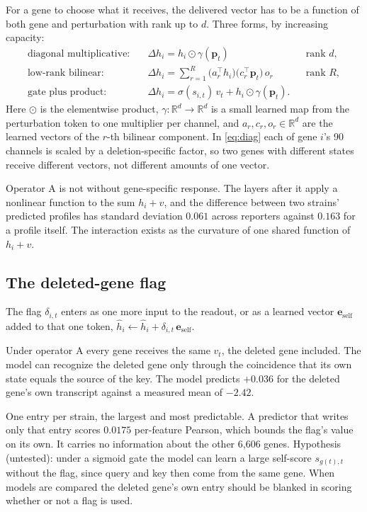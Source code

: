For a gene to choose what it receives, the delivered vector has to be a function of both
gene and perturbation with rank up to $d$. Three forms, by increasing capacity:
\begin{align}
\text{diagonal multiplicative:}\quad & \Delta h_i=h_i\odot\gamma(\mathbf{p}_t)
  && \text{rank } d, \label{eq:diag}\\
\text{low-rank bilinear:}\quad & \Delta h_i=\sum_{r=1}^{R}\big(a_r^{\top}h_i\big)\big(c_r^{\top}\mathbf{p}_t\big)\,o_r
  && \text{rank } R, \label{eq:bilinear}\\
\text{gate plus product:}\quad & \Delta h_i=\sigma(s_{i,t})\,v_t+h_i\odot\gamma(\mathbf{p}_t). \label{eq:both}
\end{align}
Here $\odot$ is the elementwise product, $\gamma:\mathbb{R}^d\to\mathbb{R}^d$ is a small
learned map from the perturbation token to one multiplier per channel, and
$a_r,c_r,o_r\in\mathbb{R}^d$ are the learned vectors of the $r$-th bilinear component. In
\cref{eq:diag} each of gene $i$'s 90 channels is scaled by a deletion-specific factor, so
two genes with different states receive different vectors, not different amounts of one
vector.

Operator A is not without gene-specific response. The layers after it apply a nonlinear
function to the sum $h_i+v$, and the difference between two strains' predicted profiles
has standard deviation $0.061$ across reporters against $0.163$ for a profile itself. The
interaction exists as the curvature of one shared function of $h_i+v$.

\subsection{The deleted-gene flag}

The flag $\delta_{i,t}$ enters as one more input to the readout, or as a learned vector
$\mathbf{e}_{\mathrm{self}}$ added to that one token,
$\hat h_i\leftarrow\hat h_i+\delta_{i,t}\,\mathbf{e}_{\mathrm{self}}$.

 Under operator A every gene receives the same $v_t$, the deleted
gene included. The model can recognize the deleted gene only through the coincidence that
its own state equals the source of the key. The model predicts $+0.036$ for the deleted
gene's own transcript against a measured mean of $-2.42$.

 One entry per strain, the largest and most predictable. A predictor
that writes only that entry scores $0.0175$ per-feature Pearson, which bounds the flag's
value on its own. It carries no information about the other 6{,}606 genes. Hypothesis
(untested): under a sigmoid gate the model can learn a large self-score
$s_{g(t),t}$ without the flag, since query and key then come from the same gene. When
models are compared the deleted gene's own entry should be blanked in scoring whether or
not a flag is used.
